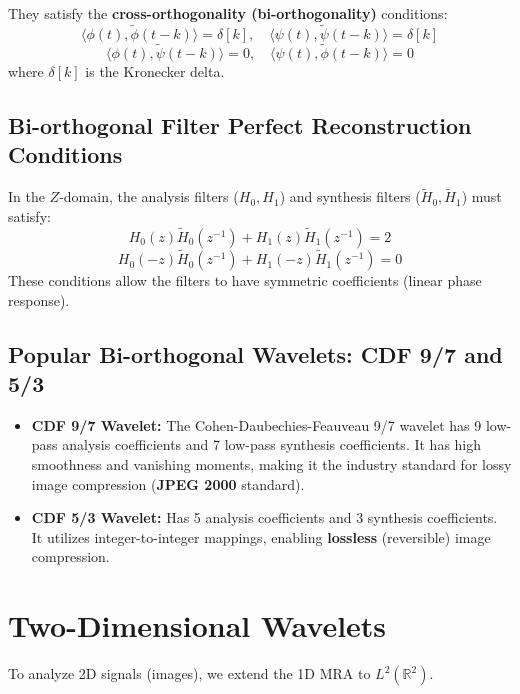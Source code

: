 \documentclass[12pt,a4paper]{article}
\begin{document}
They satisfy the \textbf{cross-orthogonality (bi-orthogonality)} conditions:
$$\langle \phi(t), \tilde{\phi}(t-k) \rangle = \delta[k], \quad \langle \psi(t), \tilde{\psi}(t-k) \rangle = \delta[k]$$
$$\langle \phi(t), \tilde{\psi}(t-k) \rangle = 0, \quad \langle \psi(t), \tilde{\phi}(t-k) \rangle = 0$$
where $\delta[k]$ is the Kronecker delta.

\subsection{Bi-orthogonal Filter Perfect Reconstruction Conditions}
In the $Z$-domain, the analysis filters ($H_0, H_1$) and synthesis filters ($\tilde{H}_0, \tilde{H}_1$) must satisfy:
$$H_0(z)\tilde{H}_0(z^{-1}) + H_1(z)\tilde{H}_1(z^{-1}) = 2$$
$$H_0(-z)\tilde{H}_0(z^{-1}) + H_1(-z)\tilde{H}_1(z^{-1}) = 0$$
These conditions allow the filters to have symmetric coefficients (linear phase response).

\subsection{Popular Bi-orthogonal Wavelets: CDF 9/7 and 5/3}
\begin{itemize}[leftmargin=*, itemsep=4.5pt]
  \item \textbf{CDF 9/7 Wavelet:} The Cohen-Daubechies-Feauveau 9/7 wavelet has 9 low-pass analysis coefficients and 7 low-pass synthesis coefficients. It has high smoothness and vanishing moments, making it the industry standard for lossy image compression (\textbf{JPEG 2000} standard).
  \item \textbf{CDF 5/3 Wavelet:} Has 5 analysis coefficients and 3 synthesis coefficients. It utilizes integer-to-integer mappings, enabling \textbf{lossless} (reversible) image compression.
\end{itemize}

\section{Two-Dimensional Wavelets}

To analyze 2D signals (images), we extend the 1D MRA to $L^2(\mathbb{R}^2)$.
\end{document}
